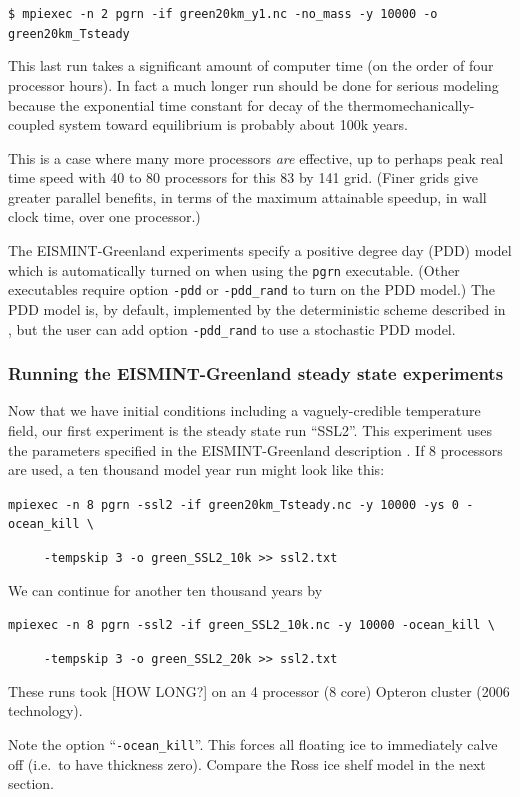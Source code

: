 \documentclass[11pt,final]{amsart}
\begin{document}
\verb|$ mpiexec -n 2 pgrn -if green20km_y1.nc -no_mass -y 10000 -o green20km_Tsteady|

\noindent This last run takes a significant amount of computer time (on the order of four processor hours).  In fact a much longer run should be done for serious modeling because the exponential time constant for decay of the thermomechanically-coupled system toward equilibrium is probably about 100k years.

This is a case where many more processors \emph{are} effective, up to perhaps peak real time speed with 40 to 80 processors for this 83 by 141 grid.  (Finer grids give greater parallel benefits, in terms of the maximum attainable speedup, in wall clock time, over one processor.)

The EISMINT-Greenland experiments \cite{RitzEISMINT} specify a positive degree day (PDD) model which is automatically turned on when using the \verb|pgrn| executable.  (Other executables require option \verb|-pdd| or \verb|-pdd_rand| to turn on the PDD model.)  The PDD model is, by default, implemented by the deterministic scheme described in \cite{CalovGreve05}, but the user can add option \verb|-pdd_rand| to use a stochastic PDD model.

\subsubsection*{Running the EISMINT-Greenland steady state experiments}  Now that we have initial conditions including a vaguely-credible temperature field, our first experiment is the steady state run ``SSL2''.  This experiment uses the parameters specified in the EISMINT-Greenland description \cite{RitzEISMINT}.  If 8 processors are used, a ten thousand model year run might look like this:

\verb|mpiexec -n 8 pgrn -ssl2 -if green20km_Tsteady.nc -y 10000 -ys 0 -ocean_kill \|

\verb|     -tempskip 3 -o green_SSL2_10k >> ssl2.txt|

\noindent We can continue for another ten thousand years by

\verb|mpiexec -n 8 pgrn -ssl2 -if green_SSL2_10k.nc -y 10000 -ocean_kill \|

\verb|     -tempskip 3 -o green_SSL2_20k >> ssl2.txt|

These runs took [HOW LONG?] on an 4 processor (8 core) Opteron cluster (2006 technology).

Note the option ``\verb|-ocean_kill|''.  This forces all floating ice to immediately calve off (i.e.~to have thickness zero).  Compare the Ross ice shelf model in the next section.
\end{document}
